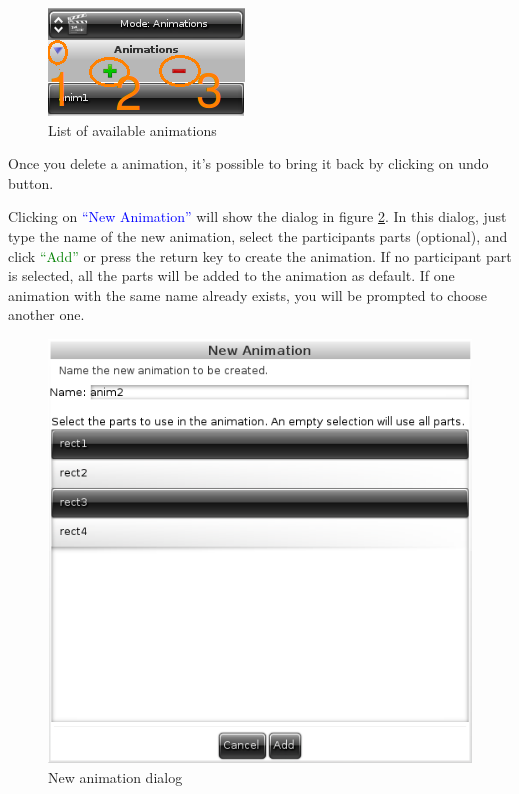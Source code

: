 \documentclass[a4paper]{profusion}
\newcommand{\GUIButton}[1]{\textcolor{green}{#1}} %
\newcommand{\GUIIcon}[1]{\textcolor{blue}{#1}}    %
\begin{document}
\begin{figure}[h!]
  \centering
  \includegraphics{images/animation_list.png}
  \caption{List of available animations}
  \label{fig:animation_list}
\end{figure}

Once you delete a animation, it's possible to bring it back by
clicking on undo button.

Clicking on \GUIIcon{``New Animation''} will show the dialog in figure
\ref{fig:animation_dialog_new}. In this dialog, just type the name of
the new animation, select the participants parts (optional), and click
\GUIButton{``Add''} or press the return key to create the
animation. If no participant part is selected, all the parts will be
added to the animation as default. If one animation with the same name
already exists, you will be prompted to choose another one.

\begin{figure}[h!]
  \centering
  \includegraphics{images/animation_dialog_new.png}
  \caption{New animation dialog}
  \label{fig:animation_dialog_new}
\end{figure}
\end{document}
